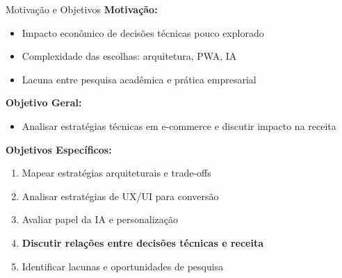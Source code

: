 \documentclass{beamer}
\begin{document}
    \begin{frame}{Motivação e Objetivos}
        \textbf{Motivação:}
        \begin{itemize}
            \item Impacto econômico de decisões técnicas pouco explorado
            \item Complexidade das escolhas: arquitetura, PWA, IA
            \item Lacuna entre pesquisa acadêmica e prática empresarial
        \end{itemize}

        \vspace{0.3cm}

        \textbf{Objetivo Geral:}
        \begin{itemize}
            \item Analisar estratégias técnicas em e-commerce e discutir impacto na receita
        \end{itemize}

        \vspace{0.3cm}

        \textbf{Objetivos Específicos:}
        \begin{enumerate}
            \item Mapear estratégias arquiteturais e trade-offs
            \item Analisar estratégias de UX/UI para conversão
            \item Avaliar papel da IA e personalização
            \item \textbf{Discutir relações entre decisões técnicas e receita}
            \item Identificar lacunas e oportunidades de pesquisa
        \end{enumerate}
    \end{frame}

\end{document}
